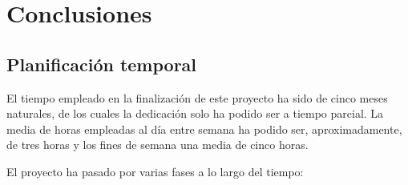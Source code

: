 \documentclass[a4paper, 12pt]{book}
\begin{document}

\cleardoublepage
\chapter{Conclusiones}
\label{chap:conclusiones}
 
\section{Planificaci\'on temporal}
\label{sec:planificacion-temporal}

El tiempo empleado en la finalizaci\'on de este proyecto ha sido de cinco meses naturales, de los cuales la dedicaci\'on solo ha podido ser a tiempo parcial. La media de horas empleadas al d\'ia entre semana ha podido ser, aproximadamente, de tres horas y los fines de semana una media de cinco horas. 

El proyecto ha pasado por varias fases a lo largo del tiempo:
\end{document}
